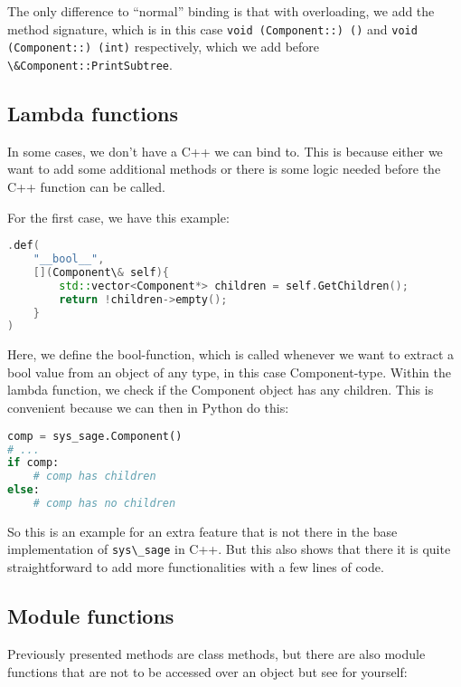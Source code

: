The only difference to “normal” binding is that with overloading, we add the method signature, which is in this case \verb|void (Component::) ()| and \verb|void (Component::) (int)| respectively, which we add before \verb|\&Component::PrintSubtree|.


\subsection{Lambda functions}

In some cases, we don't have a C++ we can bind to. This is because either we want to add some additional methods or there is some logic needed before the C++ function can be called.

For the first case, we have this example:
\newpage
\begin{lstlisting}[language=C++, xleftmargin=4em]
.def(
    "__bool__",
    [](Component\& self){
        std::vector<Component*> children = self.GetChildren();
        return !children->empty();
    }
)
\end{lstlisting}

Here, we define the bool-function, which is called whenever we want to extract a bool value from an object of any type, in this case Component-type. Within the lambda function, we check if the Component object has any children. This is convenient because we can then in Python do this:

\begin{lstlisting}[language=Python,xleftmargin=4em]
comp = sys_sage.Component()
# ...
if comp:
    # comp has children
else:
    # comp has no children
\end{lstlisting}

So this is an example for an extra feature that is not there in the base implementation of \verb|sys\_sage| in C++. But this also shows that there it is quite straightforward to add more functionalities with a few lines of code.

\subsection{Module functions}

Previously presented methods are class methods, but there are also module functions that are not to be accessed over an object but see for yourself:

